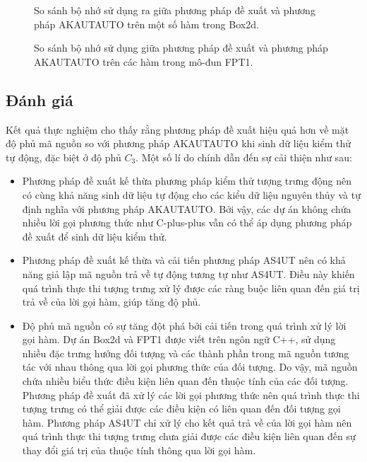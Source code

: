 \begin{figure}[H]
    \centering
    
    \caption{So sánh bộ nhớ sử dụng ra giữa phương pháp đề xuất và phương pháp AKAUTAUTO trên một số hàm trong Box2d.}
    \label{fig:mem-box2d}
\end{figure}

\begin{figure}[H]
    \centering
    
    \caption{So sánh bộ nhớ sử dụng giữa phương pháp đề xuất và phương pháp AKAUTAUTO trên các hàm trong mô-đun FPT1.}
    \label{fig:mem-serviceproxy}
\end{figure}

\subsection{Đánh giá}
Kết quả thực nghiệm cho thấy rằng phương pháp đề xuất hiệu quả hơn về mặt độ phủ mã nguồn so với phương pháp AKAUTAUTO khi sinh dữ liệu kiểm thử tự động, đặc biệt ở độ phủ $C_3$. Một số lí do chính dẫn đến sự cải thiện như sau:
\begin{itemize}
    \item Phương pháp đề xuất kế thừa phương pháp kiểm thử tượng trưng động nên có cùng khả năng sinh dữ liệu tự động cho các kiểu dữ liệu nguyên thủy và tự định nghĩa với phương pháp AKAUTAUTO. Bởi vậy, các dự án không chứa nhiều lời gọi phương thức như C-plus-plus vẫn có thể áp dụng phương pháp đề xuất để sinh dữ liệu kiểm thử.
  
    \item Phương pháp đề xuất kế thừa và cải tiến phương pháp AS4UT nên có khả năng giả lập mã nguồn trả về tự động tương tự như AS4UT. Điều này khiến quá trình thực thi tượng trưng xử lý được các ràng buộc liên quan đến giá trị trả về của lời gọi hàm, giúp tăng độ phủ.
    
    \item Độ phủ mã nguồn có sự tăng đột phá bởi cải tiến trong quá trình xử lý lời gọi hàm. Dự án Box2d và FPT1 được viết trên ngôn ngữ C++, sử dụng nhiều đặc trưng hướng đối tượng và các thành phần trong mã nguồn tương tác với nhau thông qua lời gọi phương thức của đối tượng. Do vậy, mã nguồn chứa nhiều biểu thức điều kiện liên quan đến thuộc tính của các đối tượng. Phương pháp đề xuất đã xử lý các lời gọi phương thức nên quá trình thực thi tượng trưng có thể giải được các điều kiện có liên quan đến đối tượng gọi hàm. Phương pháp AS4UT chỉ xử lý cho kết quả trả về của lời gọi hàm nên quá trình thực thi tượng trưng chưa giải được các điều kiện liên quan đến sự thay đổi giá trị của thuộc tính thông qua lời gọi hàm.
\end{itemize}

